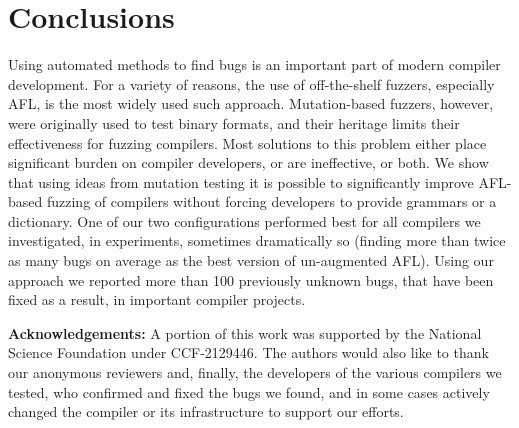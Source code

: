 \section{Conclusions}

Using automated methods to find bugs is an important part of modern
compiler development.  For a variety of reasons, the use of
off-the-shelf fuzzers, especially AFL, is the most widely used such
approach.  Mutation-based fuzzers, however, were originally used to
test binary formats, and their heritage limits their effectiveness for
fuzzing compilers.  Most solutions to this problem either place significant
burden on compiler developers, or are ineffective, or both.  We show
that using ideas from mutation testing it is possible to significantly
improve AFL-based fuzzing of compilers without forcing developers to
provide grammars or a dictionary.  One of our two configurations
performed best for all compilers we investigated, in experiments,
sometimes dramatically so (finding more than twice as many bugs on
average as the best version of un-augmented AFL).  Using our approach
we reported more than 100 previously unknown bugs, that have been
fixed as a result, in important
compiler projects.

\begin{sloppypar}
{\bf Acknowledgements:}  A portion of this work was
  supported by the National Science Foundation under CCF-2129446.  The
authors would also like to thank our anonymous reviewers and, finally, the
developers of the various compilers we tested, who confirmed and fixed
the bugs we found, and in some cases actively changed the compiler or
its infrastructure to support our efforts.
\end{sloppypar}